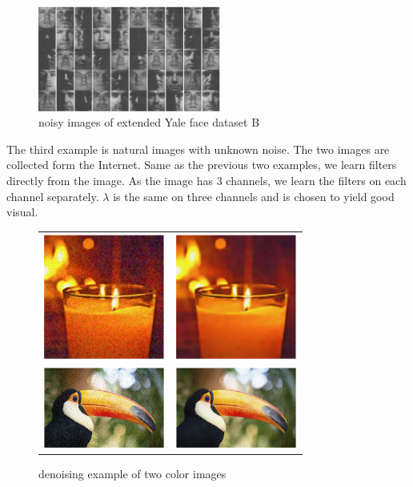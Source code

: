\documentclass[a4paper]{article}
\begin{document}
\begin{figure}
\centering
\label{fig:yale}
\includegraphics[width=6cm]{./figures/3_2.eps}
\caption{noisy images of extended Yale face dataset B}
\end{figure}
The third example is natural images with unknown noise. The two images are collected form the Internet. Same as the previous two examples, we learn filters directly from the image. As the image has 3 channels, we learn the filters on each channel separately. $\lambda$ is the same on three channels and is chosen to yield good visual. 

\begin{figure}[h!]
\centering
\begin{tabular}{c c}
\includegraphics[width=4cm]{./figures/candle_noise.eps} & \includegraphics[width=4cm]{./figures/candle_clean.eps}\\
\includegraphics[width=4cm]{./figures/bird_noise.eps} & \includegraphics[width=4cm]{./figures/bird_clean.eps}\\
\end{tabular}
\caption{denoising example of two color images}
\end{figure}
\end{document}
